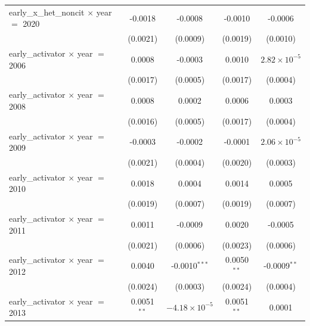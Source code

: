 \begin{tabular}{lcccc}
   early\_x\_het\_noncit $\times$ year $=$ 2020     & -0.0018            & -0.0008                   & -0.0010              & -0.0006\\   
                                                    & (0.0021)           & (0.0009)                  & (0.0019)             & (0.0010)\\   
   early\_activator $\times$ year $=$ 2006          & 0.0008             & -0.0003                   & 0.0010               & $2.82\times 10^{-5}$\\    
                                                    & (0.0017)           & (0.0005)                  & (0.0017)             & (0.0004)\\   
   early\_activator $\times$ year $=$ 2008          & 0.0008             & 0.0002                    & 0.0006               & 0.0003\\   
                                                    & (0.0016)           & (0.0005)                  & (0.0017)             & (0.0004)\\   
   early\_activator $\times$ year $=$ 2009          & -0.0003            & -0.0002                   & -0.0001              & $2.06\times 10^{-5}$\\    
                                                    & (0.0021)           & (0.0004)                  & (0.0020)             & (0.0003)\\   
   early\_activator $\times$ year $=$ 2010          & 0.0018             & 0.0004                    & 0.0014               & 0.0005\\   
                                                    & (0.0019)           & (0.0007)                  & (0.0019)             & (0.0007)\\   
   early\_activator $\times$ year $=$ 2011          & 0.0011             & -0.0009                   & 0.0020               & -0.0005\\   
                                                    & (0.0021)           & (0.0006)                  & (0.0023)             & (0.0006)\\   
   early\_activator $\times$ year $=$ 2012          & 0.0040             & -0.0010$^{***}$           & 0.0050$^{**}$        & -0.0009$^{**}$\\   
                                                    & (0.0024)           & (0.0003)                  & (0.0024)             & (0.0004)\\   
   early\_activator $\times$ year $=$ 2013          & 0.0051$^{**}$      & $-4.18\times 10^{-5}$     & 0.0051$^{**}$        & 0.0001\\   

\end{tabular}
